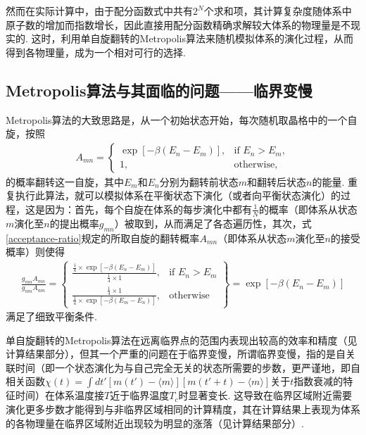 \documentclass[UTF8,10pt,a4paper]{article}
\theoremstyle{Problem}
\theoremstyle{Solution}
\begin{document}
然而在实际计算中，由于配分函数式中共有$2^N$个求和项，其计算复杂度随体系中原子数的增加而指数增长，因此直接用配分函数精确求解较大体系的物理量是不现实的. 这时，利用单自旋翻转的Metropolis算法来随机模拟体系的演化过程，从而得到各物理量，成为一个相对可行的选择.


\subsection{Metropolis算法与其面临的问题——临界变慢}

Metropolis算法的大致思路是，从一个初始状态开始，每次随机取晶格中的一个自旋，按照
\begin{align}
    \label{acceptance-ratio}
    A_{mn}=\left\{\begin{array}{ll}
        \exp[-\beta(E_n-E_m)],&\text{if }E_n>E_m,\\
        1,&\text{otherwise},
    \end{array}\right.
\end{align}
的概率翻转这一自旋，其中$E_m$和$E_n$分别为翻转前状态$m$和翻转后状态$n$的能量. 重复执行此算法，就可以模拟体系在平衡状态下演化（或者向平衡状态演化）的过程，这是因为：首先，每个自旋在体系的每步演化中都有$\frac{1}{N}$的概率（即体系从状态$m$演化至$n$的提出概率$g_{mn}$）被取到，从而满足了各态遍历性，其次，式\eqref{acceptance-ratio}规定的所取自旋的翻转概率$A_{mn}$（即体系从状态$m$演化至$n$的接受概率）则使得
\begin{align}
    \frac{g_{mn}A_{mn}}{g_{nm}A_{nm}}=\left\{\begin{array}{ll}
        \frac{\frac{1}{4}\times\exp[-\beta(E_n-E_m)]}{\frac{1}{4}\times 1},&\text{if }E_n>E_m\\
        \frac{\frac{1}{4}\times 1}{\frac{1}{4}\times\exp[-\beta(E_m-E_n)]},&\text{otherwise}
    \end{array}\right\}=\exp[-\beta(E_n-E_m)]
\end{align}
满足了细致平衡条件.

单自旋翻转的Metropolis算法在远离临界点的范围内表现出较高的效率和精度（见计算结果部分），但其一个严重的问题在于临界变慢，所谓临界变慢，指的是自关联时间（即一个状态演化为与自己完全无关的状态所需要的步数，更严谨地，即自相关函数$\chi(t)=\int dt'[m(t')-\langle m\rangle][m(t'+t)-\langle m\rangle]$关于$t$指数衰减的特征时间）在体系温度接$T$近于临界温度$T_c$时显著变长. 这导致在临界区域附近需要演化更多步数才能得到与非临界区域相同的计算精度，其在计算结果上表现为体系的各物理量在临界区域附近出现较为明显的涨落（见计算结果部分）.
\end{document}
